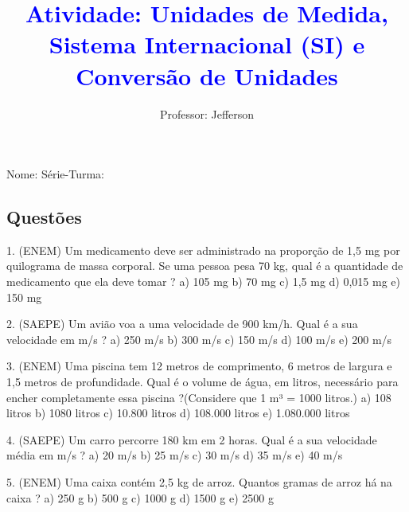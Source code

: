 \documentclass[12pt]{article}
\title{\textcolor{blue}{Atividade: Unidades de Medida, Sistema Internacional (SI) e Conversão de Unidades}}
\author{Professor: Jefferson}
\date{}
\begin{document}
\maketitle
\thispagestyle{empty}

\begin{center}
\large{Nome: \underline{\hspace{8cm}} \quad Série-Turma: \underline{\hspace{3cm}}}
\end{center}

\vspace{1cm}

\begin{multicols}{2}

\section*{Questões}

1. (ENEM) Um medicamento deve ser administrado na proporção de 1,5 mg por quilograma de massa corporal. Se uma pessoa
    pesa 70 kg, qual é a quantidade de medicamento que ela deve tomar ?\newline
a) 105 mg  
b) 70 mg  
c) 1,5 mg  
d) 0,015 mg  
e) 150 mg  
\vspace{0.5cm}

2. (SAEPE) Um avião voa a uma velocidade de 900 km/h. Qual é a sua velocidade em m/s ?\newline  
a) 250 m/s  
b) 300 m/s  
c) 150 m/s  
d) 100 m/s  
e) 200 m/s  
\vspace{0.5cm}

3. (ENEM) Uma piscina tem 12 metros de comprimento, 6 metros de largura e 1,5 metros de profundidade. Qual é o volume de água, em litros, necessário para encher completamente essa piscina ?\newline (Considere que 1 m³ = 1000 litros.)  
a) 108 litros  
b) 1080 litros  
c) 10.800 litros  
d) 108.000 litros  
e) 1.080.000 litros  
\vspace{0.5cm}

4. (SAEPE) Um carro percorre 180 km em 2 horas. Qual é a sua velocidade média em m/s ?\newline  
a) 20 m/s  
b) 25 m/s  
c) 30 m/s  
d) 35 m/s  
e) 40 m/s  
\vspace{0.5cm}

5. (ENEM) Uma caixa contém 2,5 kg de arroz. Quantos gramas de arroz há na caixa ?\newline  
a) 250 g  
b) 500 g  
c) 1000 g  
d) 1500 g  
e) 2500 g  
\vspace{0.5cm}


\end{multicols}
\end{document}
